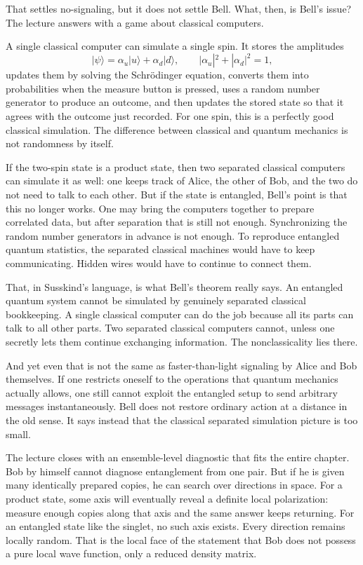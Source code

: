 That settles no-signaling, but it does not settle Bell. What, then, is Bell's issue? The lecture answers with a game about classical computers.

A single classical computer can simulate a single spin. It stores the amplitudes
\begin{equation}
|\psi\rangle=\alpha_u|u\rangle+\alpha_d|d\rangle,
\qquad
|\alpha_u|^2+|\alpha_d|^2=1,
\end{equation}
updates them by solving the Schr\"odinger equation, converts them into probabilities when the measure button is pressed, uses a random number generator to produce an outcome, and then updates the stored state so that it agrees with the outcome just recorded. For one spin, this is a perfectly good classical simulation. The difference between classical and quantum mechanics is not randomness by itself.

If the two-spin state is a product state, then two separated classical computers can simulate it as well: one keeps track of Alice, the other of Bob, and the two do not need to talk to each other. But if the state is entangled, Bell's point is that this no longer works. One may bring the computers together to prepare correlated data, but after separation that is still not enough. Synchronizing the random number generators in advance is not enough. To reproduce entangled quantum statistics, the separated classical machines would have to keep communicating. Hidden wires would have to continue to connect them.

That, in Susskind's language, is what Bell's theorem really says. An entangled quantum system cannot be simulated by genuinely separated classical bookkeeping. A single classical computer can do the job because all its parts can talk to all other parts. Two separated classical computers cannot, unless one secretly lets them continue exchanging information. The nonclassicality lies there.

And yet even that is not the same as faster-than-light signaling by Alice and Bob themselves. If one restricts oneself to the operations that quantum mechanics actually allows, one still cannot exploit the entangled setup to send arbitrary messages instantaneously. Bell does not restore ordinary action at a distance in the old sense. It says instead that the classical separated simulation picture is too small.

The lecture closes with an ensemble-level diagnostic that fits the entire chapter. Bob by himself cannot diagnose entanglement from one pair. But if he is given many identically prepared copies, he can search over directions in space. For a product state, some axis will eventually reveal a definite local polarization: measure enough copies along that axis and the same answer keeps returning. For an entangled state like the singlet, no such axis exists. Every direction remains locally random. That is the local face of the statement that Bob does not possess a pure local wave function, only a reduced density matrix.

